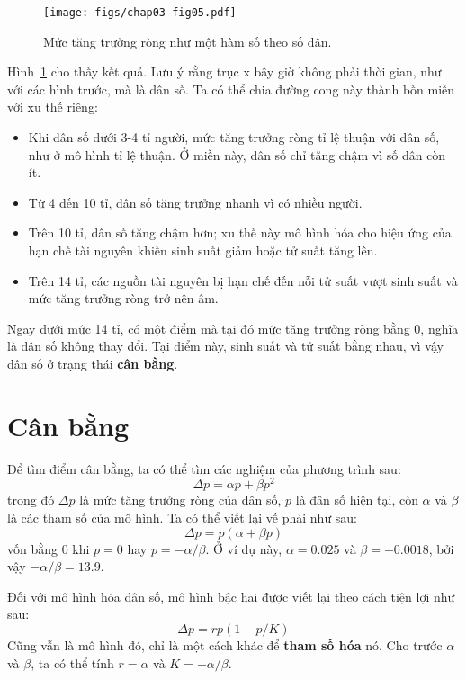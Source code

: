 \documentclass[12pt, openany]{book}
\theoremstyle{exercise}
\begin{document}
\begin{figure}
\centerline{\texttt{[image: figs/chap03-fig05.pdf]}}
\caption{Mức tăng trưởng ròng như một hàm số theo số dân.}
\label{chap03-fig05}
\end{figure}

Hình~\ref{chap03-fig05} cho thấy kết quả. Lưu ý rằng trục x bây giờ không phải thời gian, như với các hình trước, mà là dân số. Ta có thể chia đường cong này thành bốn miền với xu thế riêng:

\begin{itemize}

\item Khi dân số dưới 3-4 tỉ người, mức tăng trưởng ròng tỉ lệ thuận với dân số, như ở mô hình tỉ lệ thuận. Ở miền này, dân số chỉ tăng chậm vì số dân còn ít.

\item Từ 4 đến 10 tỉ, dân số tăng trưởng nhanh vì có nhiều người.

\item Trên 10 tỉ, dân số tăng chậm hơn; xu thế này mô hình hóa cho hiệu ứng của hạn chế tài nguyên khiến sinh suất giảm hoặc tử suất tăng lên.

\item Trên 14 tỉ, các nguồn tài nguyên bị hạn chế đến nỗi tử suất vượt sinh suất và mức tăng trưởng ròng trở nên âm.

\end{itemize}

Ngay dưới mức 14 tỉ, có một điểm mà tại đó mức tăng trưởng ròng bằng 0, nghĩa là dân số không thay đổi. Tại điểm này, sinh suất và tử suất bằng nhau, vì vậy dân số ở trạng thái {\bf cân bằng}.



\section{Cân bằng}
\label{equilibrium}

Để tìm điểm cân bằng, ta có thể tìm các nghiệm của phương trình sau:
%
\[ \Delta p = \alpha p + \beta p^2 \]
%
trong đó $\Delta p$ là mức tăng trưởng ròng của dân số, $p$ là đân số hiện tại, còn $\alpha$ và $\beta$ là các tham số của mô hình. Ta có thể viết lại vế phải như sau:
%
\[ \Delta p = p (\alpha + \beta p) \]
%
vốn bằng $0$ khi $p=0$ hay $p=-\alpha/\beta$.  Ở ví dụ này, $\alpha = 0.025$ và $\beta = -0.0018$, bởi vậy $-\alpha/\beta = 13.9$.

Đối với mô hình hóa dân số, mô hình bậc hai được viết lại theo cách tiện lợi như sau:
%
\[ \Delta p = r p (1 - p / K) \]
%
Cũng vẫn là mô hình đó, chỉ là một cách khác để {\bf tham số hóa} nó. Cho trước $\alpha$ và $\beta$, ta có thể tính $r=\alpha$ và $K=-\alpha/\beta$.
\end{document}
